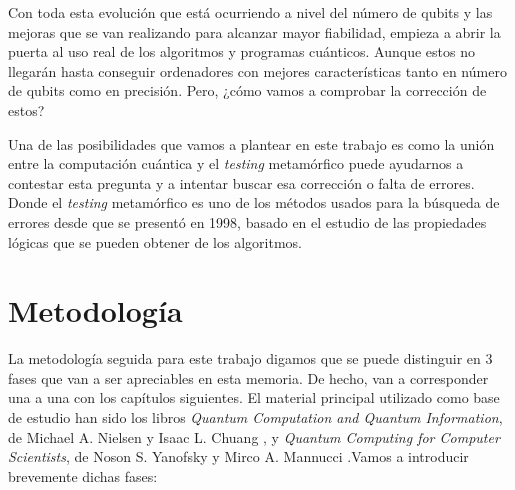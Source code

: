 Con toda esta evolución que está ocurriendo a nivel del número de qubits y las mejoras que se van realizando para alcanzar mayor fiabilidad, empieza a abrir la puerta al uso real de los algoritmos y programas cuánticos. Aunque estos no llegarán hasta conseguir ordenadores con mejores características tanto en número de qubits como en precisión. Pero, ¿cómo vamos a comprobar la corrección de estos? \newline 

Una de las posibilidades que vamos a plantear en este trabajo es como la unión entre la computación cuántica y el \textit{testing} metamórfico puede ayudarnos a contestar esta pregunta y a intentar buscar esa corrección o falta de errores. Donde el \textit{testing} metamórfico es uno de los métodos usados para la búsqueda de errores desde que se presentó en 1998\cite{Note:MT:1998}, basado en el estudio de las propiedades lógicas que se pueden obtener de los algoritmos.

\section{Metodología}
\label{Sec1.1:Metodologia}

La metodología seguida para este trabajo digamos que se puede distinguir en 3 fases que van a ser apreciables en esta memoria. De hecho, van a corresponder una a una con los capítulos siguientes. El material principal utilizado como base de estudio han sido los libros \textit{Quantum Computation and Quantum Information}, de Michael A. Nielsen y Isaac L. Chuang \cite{B:Nielsen:2002}, y \textit{Quantum Computing for Computer Scientists}, de Noson S. Yanofsky y Mirco A. Mannucci \cite{B:QuantumScientist:2008}.Vamos a introducir brevemente dichas fases: 

